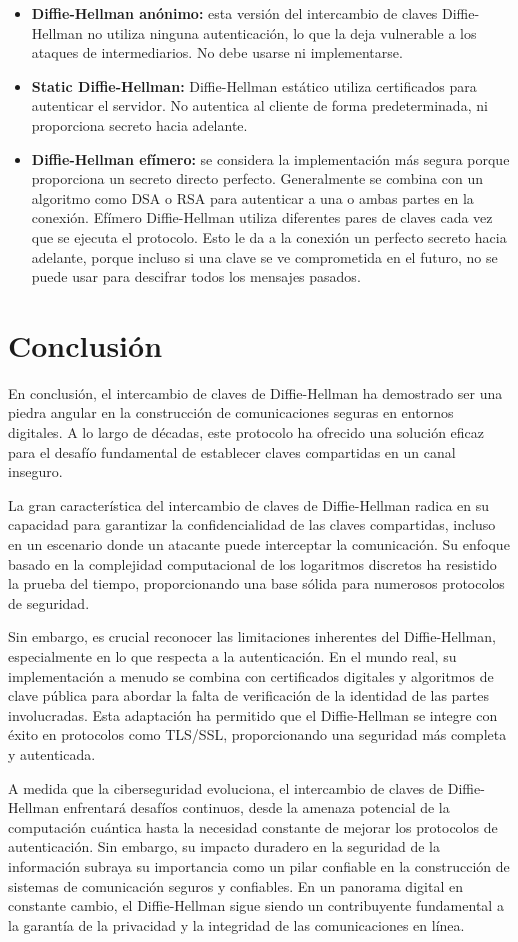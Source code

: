 \documentclass[11pt]{article}
\begin{document}
\begin{itemize}
    \item \textbf{Diffie-Hellman anónimo:} esta versión del intercambio de claves Diffie-Hellman no utiliza ninguna autenticación, lo que la deja vulnerable a los ataques de intermediarios. No debe usarse ni implementarse.
    \item \textbf{Static Diffie-Hellman:} Diffie-Hellman estático utiliza certificados para autenticar el servidor. No autentica al cliente de forma predeterminada, ni proporciona secreto hacia adelante.
    \item \textbf{Diffie-Hellman efímero:} se considera la implementación más segura porque proporciona un secreto directo perfecto. Generalmente se combina con un algoritmo como DSA o RSA para autenticar a una o ambas partes en la conexión. Efímero Diffie-Hellman utiliza diferentes pares de claves cada vez que se ejecuta el protocolo. Esto le da a la conexión un perfecto secreto hacia adelante, porque incluso si una clave se ve comprometida en el futuro, no se puede usar para descifrar todos los mensajes pasados.\\
\end{itemize}

\section{Conclusión}
En conclusión, el intercambio de claves de Diffie-Hellman ha demostrado ser una piedra angular en la construcción de comunicaciones seguras en entornos digitales. A lo largo de décadas, este protocolo ha ofrecido una solución eficaz para el desafío fundamental de establecer claves compartidas en un canal inseguro.

La gran característica del intercambio de claves de Diffie-Hellman radica en su capacidad para garantizar la confidencialidad de las claves compartidas, incluso en un escenario donde un atacante puede interceptar la comunicación. Su enfoque basado en la complejidad computacional de los logaritmos discretos ha resistido la prueba del tiempo, proporcionando una base sólida para numerosos protocolos de seguridad.

Sin embargo, es crucial reconocer las limitaciones inherentes del Diffie-Hellman, especialmente en lo que respecta a la autenticación. En el mundo real, su implementación a menudo se combina con certificados digitales y algoritmos de clave pública para abordar la falta de verificación de la identidad de las partes involucradas. Esta adaptación ha permitido que el Diffie-Hellman se integre con éxito en protocolos como TLS/SSL, proporcionando una seguridad más completa y autenticada.

A medida que la ciberseguridad evoluciona, el intercambio de claves de Diffie-Hellman enfrentará desafíos continuos, desde la amenaza potencial de la computación cuántica hasta la necesidad constante de mejorar los protocolos de autenticación. Sin embargo, su impacto duradero en la seguridad de la información subraya su importancia como un pilar confiable en la construcción de sistemas de comunicación seguros y confiables. En un panorama digital en constante cambio, el Diffie-Hellman sigue siendo un contribuyente fundamental a la garantía de la privacidad y la integridad de las comunicaciones en línea.
\end{document}
